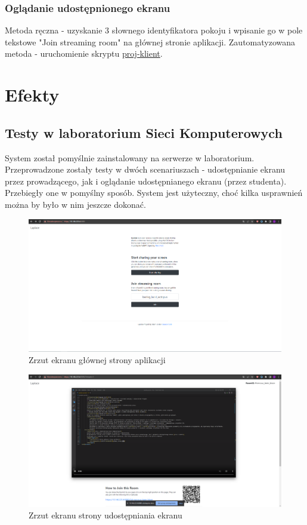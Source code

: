 \documentclass[a4paper,11pt]{article}
\begin{document}
            \subsubsection{Oglądanie udostępnionego ekranu}
            Metoda ręczna - uzyskanie 3 słownego identyfikatora pokoju i wpisanie go w pole tekstowe "Join streaming room" na głównej stronie aplikacji.
            Zautomatyzowana metoda - uruchomienie skryptu \hyperref[proj-klient]{proj-klient}.
    \section{Efekty}
        \subsection{Testy w laboratorium Sieci Komputerowych}
        System został pomyślnie zainstalowany na serwerze w laboratorium. 
        Przeprowadzone zostały testy w dwóch scenariuszach - udostępnianie ekranu przez prowadzącego, jak i oglądanie udostępnianego ekranu (przez studenta).
        Przebiegły one w pomyślny sposób. System jest użyteczny, choć kilka usprawnień można by było w nim jeszcze dokonać.
        \begin{figure}[H]
            \caption{Zrzut ekranu głównej strony aplikacji}
            \includegraphics[width=1\textwidth]{glowna_strona.png}
        \end{figure}
        \begin{figure}[H]
            \caption{Zrzut ekranu strony udostępniania ekranu}
            \includegraphics[width=1\textwidth]{strona_udostepniania.png}
        \end{figure}
\end{document}
